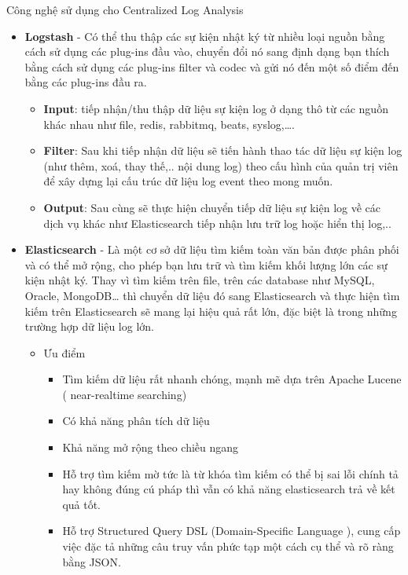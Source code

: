 		Công nghệ sử dụng cho Centralized Log Analysis
		\begin{itemize}
		    \item \textbf{Logstash} - Có thể thu thập các sự kiện nhật ký từ nhiều loại nguồn bằng cách sử dụng các plug-ins đầu vào, chuyển đổi nó sang định dạng bạn thích bằng cách sử dụng các plug-ins filter và codec và gửi nó đến một số điểm đến bằng các plug-ins đầu ra.
		    \begin{itemize}
		        \item \textbf{Input}: tiếp nhận/thu thập dữ liệu sự kiện log ở dạng thô từ các nguồn khác nhau như file, redis, rabbitmq, beats, syslog,….
		        \item \textbf{Filter}: Sau khi tiếp nhận dữ liệu sẽ tiến hành thao tác dữ liệu sự kiện log (như thêm, xoá, thay thế,.. nội dung log) theo cấu hình của quản trị viên để xây dựng lại cấu trúc dữ liệu log event theo mong muốn.
		        \item \textbf{Output}: Sau cùng sẽ thực hiện chuyển tiếp dữ liệu sự kiện log về các dịch vụ khác như Elasticsearch tiếp nhận lưu trữ log hoặc hiển thị log,..
		    \end{itemize}
		    \item \textbf{Elasticsearch} - Là một cơ sở dữ liệu tìm kiếm toàn văn bản được phân phối và có thể mở rộng, cho phép bạn lưu trữ và tìm kiếm khối lượng lớn các sự kiện nhật ký. Thay vì tìm kiếm trên file, trên các database như MySQL, Oracle, MongoDB… thì chuyển dữ liệu đó sang Elasticsearch và thực hiện tìm kiếm trên Elasticsearch sẽ mang lại hiệu quả rất lớn, đặc biệt là trong những trường hợp dữ liệu log lớn.
		    \begin{itemize}
		        \item Ưu điểm
		        \begin{itemize}
		            \item Tìm kiếm dữ liệu rất nhanh chóng, mạnh mẽ dựa trên Apache Lucene ( near-realtime searching)
		            \item Có khả năng phân tích dữ liệu
		            \item Khả năng mở rộng theo chiều ngang
		            \item Hỗ trợ tìm kiếm mờ tức là từ khóa tìm kiếm có thể bị sai lỗi chính tả hay không đúng cú pháp thì vẫn có khả năng elasticsearch trả về kết quả tốt.
		            \item Hỗ trợ Structured Query DSL (Domain-Specific Language ), cung cấp việc đặc tả những câu truy vấn phức tạp một cách cụ thể và rõ ràng bằng JSON.

\end{itemize}
\end{itemize}
\end{itemize}
